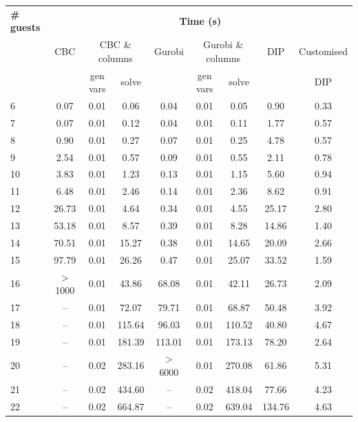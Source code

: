 \begin{table}[htp]
\begin{minipage}[l]{\textwidth}
\begin{small}
\begin{tabular}{|l@{\,}|c@{\ }|c@{\ }c@{\ }|c@{\ }|c@{\ }c@{\ }|c@{\ }c@{\,}|}
\hline
\textbf{\# guests} & \multicolumn{8}{|c|}{\textbf{Time (s)}} \\
                   & CBC & \multicolumn{2}{c|}{CBC \& columns} & Gurobi & \multicolumn{2}{c|}{Gurobi \& columns} & \ac{DIP} & Customised \\
                   &     & gen vars & solve                    &        & gen vars & solve                       &          & \ac{DIP}   \\ 
\hline 
 6 &  0.07 & 0.01 &   0.06 &   0.04 & 0.01 &   0.05 &   0.90 &  0.33 \\
 7 &  0.07 & 0.01 &   0.12 &   0.04 & 0.01 &   0.11 &   1.77 &  0.57 \\
 8 &  0.90 & 0.01 &   0.27 &   0.07 & 0.01 &   0.25 &   4.78 &  0.57 \\
 9 &  2.54 & 0.01 &   0.57 &   0.09 & 0.01 &   0.55 &   2.11 &  0.78 \\
10 &  3.83 & 0.01 &   1.23 &   0.13 & 0.01 &   1.15 &   5.60 &  0.94 \\
11 &  6.48 & 0.01 &   2.46 &   0.14 & 0.01 &   2.36 &   8.62 &  0.91 \\
12 & 26.73 & 0.01 &   4.64 &   0.34 & 0.01 &   4.55 &  25.17 &  2.80 \\
13 & 53.18 & 0.01 &   8.57 &   0.39 & 0.01 &   8.28 &  14.86 &  1.40 \\
14 & 70.51 & 0.01 &  15.27 &   0.38 & 0.01 &  14.65 &  20.09 &  2.66 \\
15 & 97.79 & 0.01 &  26.26 &   0.47 & 0.01 &  25.07 &  33.52 &  1.59 \\
16 &$>$1000& 0.01 &  43.86 &  68.08 & 0.01 &  42.11 &  26.73 &  2.09 \\
17 &    -- & 0.01 &  72.07 &  79.71 & 0.01 &  68.87 &  50.48 &  3.92 \\
18 &    -- & 0.01 & 115.64 &  96.03 & 0.01 & 110.52 &  40.80 &  4.67 \\
19 &    -- & 0.01 & 181.39 & 113.01 & 0.01 & 173.13 &  78.20 &  2.64 \\
20 &    -- & 0.02 & 283.16 &$>$6000 & 0.01 & 270.08 &  61.86 &  5.31 \\
21 &    -- & 0.02 & 434.60 &     -- & 0.02 & 418.04 &  77.66 &  4.23 \\
22 &    -- & 0.02 & 664.87 &     -- & 0.02 & 639.04 & 134.76 &  4.63 \\

\end{tabular}
\end{small}
\end{minipage}
\end{table}
